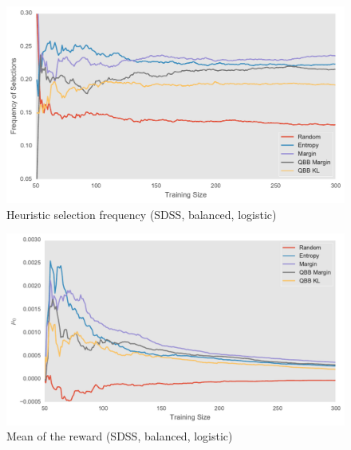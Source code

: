 \begin{figure}[p]
	\centering
	\includegraphics[width=\textwidth]{figures/5_thompson/sdss_ul_frequencies}
	\caption[Heuristic selection frequency (SDSS, unbalanced, logistic)]{
		Heuristic selection frequency (SDSS, balanced, logistic)}
	\label{fig:sdss_ul_frequencies}
\end{figure}

\begin{figure}[p]
	\centering
	\includegraphics[width=\textwidth]{figures/5_thompson/sdss_ul_mus}
	\caption[Mean of the reward (SDSS, unbalanced, logistic)]{
		Mean of the reward (SDSS, balanced, logistic)}
\end{figure}

